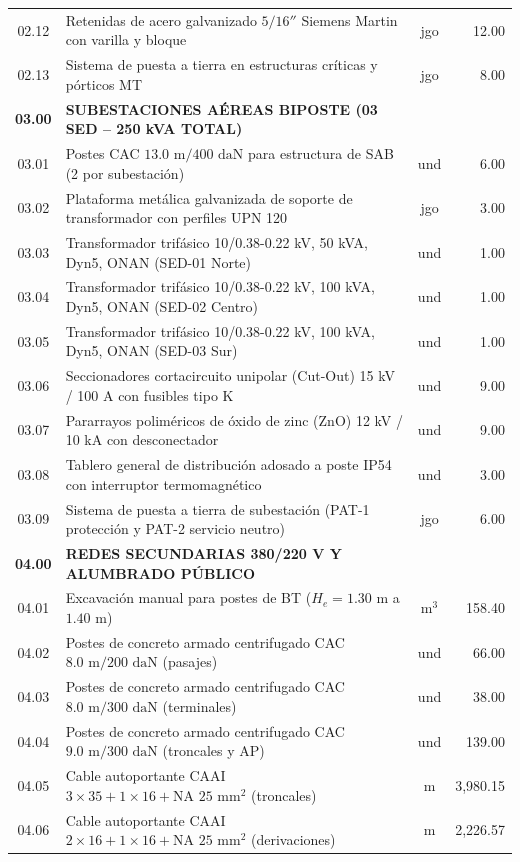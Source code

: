 \begin{table}[H]
\begin{tabular}{|c|l|c|r|}
02.12 & Retenidas de acero galvanizado $5/16''$ Siemens Martin con varilla y bloque & jgo & 12.00 \\
02.13 & Sistema de puesta a tierra en estructuras críticas y pórticos MT & jgo & 8.00 \\
\hline
\textbf{03.00} & \textbf{SUBESTACIONES AÉREAS BIPOSTE (03 SED -- 250 kVA TOTAL)} & & \\
03.01 & Postes CAC $13.0\text{ m} / 400\text{ daN}$ para estructura de SAB (2 por subestación) & und & 6.00 \\
03.02 & Plataforma metálica galvanizada de soporte de transformador con perfiles UPN 120 & jgo & 3.00 \\
03.03 & Transformador trifásico 10/0.38-0.22 kV, 50 kVA, Dyn5, ONAN (SED-01 Norte) & und & 1.00 \\
03.04 & Transformador trifásico 10/0.38-0.22 kV, 100 kVA, Dyn5, ONAN (SED-02 Centro) & und & 1.00 \\
03.05 & Transformador trifásico 10/0.38-0.22 kV, 100 kVA, Dyn5, ONAN (SED-03 Sur) & und & 1.00 \\
03.06 & Seccionadores cortacircuito unipolar (Cut-Out) 15 kV / 100 A con fusibles tipo K & und & 9.00 \\
03.07 & Pararrayos poliméricos de óxido de zinc (ZnO) 12 kV / 10 kA con desconectador & und & 9.00 \\
03.08 & Tablero general de distribución adosado a poste IP54 con interruptor termomagnético & und & 3.00 \\
03.09 & Sistema de puesta a tierra de subestación (PAT-1 protección y PAT-2 servicio neutro) & jgo & 6.00 \\
\hline
\textbf{04.00} & \textbf{REDES SECUNDARIAS 380/220 V Y ALUMBRADO PÚBLICO} & & \\
04.01 & Excavación manual para postes de BT ($H_e = 1.30\text{ m}$ a $1.40\text{ m}$) & m$^3$ & 158.40 \\
04.02 & Postes de concreto armado centrifugado CAC $8.0\text{ m} / 200\text{ daN}$ (pasajes) & und & 66.00 \\
04.03 & Postes de concreto armado centrifugado CAC $8.0\text{ m} / 300\text{ daN}$ (terminales) & und & 38.00 \\
04.04 & Postes de concreto armado centrifugado CAC $9.0\text{ m} / 300\text{ daN}$ (troncales y AP) & und & 139.00 \\
04.05 & Cable autoportante CAAI $3 \times 35 + 1 \times 16 + \text{NA } 25\text{ mm}^2$ (troncales) & m & 3,980.15 \\
04.06 & Cable autoportante CAAI $2 \times 16 + 1 \times 16 + \text{NA } 25\text{ mm}^2$ (derivaciones) & m & 2,226.57 \\

\end{tabular}
\end{table}
